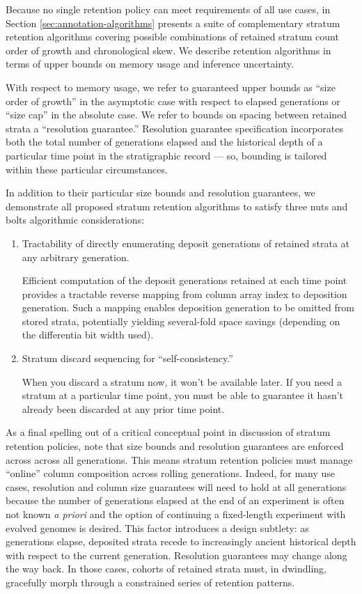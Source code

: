 Because no single retention policy can meet requirements of all use cases, in Section \ref{sec:annotation-algorithms} presents a suite of complementary stratum retention algorithms covering possible combinations of retained stratum count order of growth and chronological skew.
We describe retention algorithms in terms of upper bounds on memory usage and inference uncertainty.

With respect to memory usage, we refer to guaranteed upper bounds as ``size order of growth'' in the asymptotic case with respect to elapsed generations or ``size cap'' in the absolute case.
We refer to bounds on spacing between retained strata a ``resolution guarantee.''
Resolution guarantee specification incorporates both the total number of generations elapsed and the historical depth of a particular time point in the stratigraphic record --- so, bounding is tailored within these particular circumstances.

In addition to their particular size bounds and resolution guarantees, we demonstrate all proposed stratum retention algorithms to satisfy three nuts and bolts algorithmic considerations:
\begin{enumerate}
\item Tractability of directly enumerating deposit generations of retained strata at any arbitrary generation.

  Efficient computation of the deposit generations retained at each time point provides a tractable reverse mapping from column array index to deposition generation.
  Such a mapping enables deposition generation to be omitted from stored strata, potentially yielding several-fold space savings (depending on the differentia bit width used).

\item Stratum discard sequencing for ``self-consistency.''

  When you discard a stratum now, it won't be available later.
  If you need a stratum at a particular time point, you must be able to guarantee it hasn't already been discarded at any prior time point.

\end{enumerate}

As a final spelling out of a critical conceptual point in discussion of stratum retention policies, note that size bounds and resolution guarantees are enforced across across all generations.
This means stratum retention policies must manage ``online'' column composition across rolling generations.
Indeed, for many use cases, resolution and column size guarantees will need to hold at all generations because the number of generations elapsed at the end of an experiment is often not known \textit{a priori} and the option of continuing a fixed-length experiment with evolved genomes is desired.
This factor introduces a design subtlety: as generations elapse, deposited strata recede to increasingly ancient historical depth with respect to the current generation.
Resolution guarantees may change along the way back.
In those cases, cohorts of retained strata must, in dwindling, gracefully morph through a constrained series of retention patterns.

